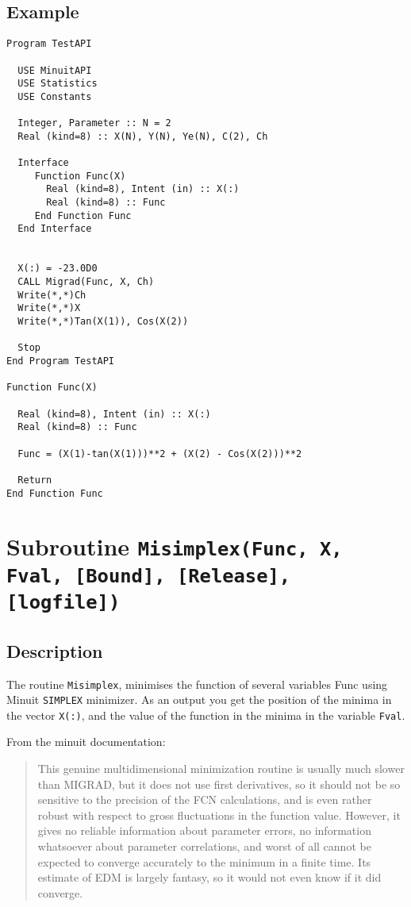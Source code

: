 \subsection{Example}

\begin{lstlisting}[emph=Minimize,
                   emphstyle=\color{blue},
                   frame=trBL,
                   caption=Using minuit library to minimize a function.,
                   label=minimize]
Program TestAPI

  USE MinuitAPI
  USE Statistics
  USE Constants

  Integer, Parameter :: N = 2
  Real (kind=8) :: X(N), Y(N), Ye(N), C(2), Ch

  Interface 
     Function Func(X)
       Real (kind=8), Intent (in) :: X(:)
       Real (kind=8) :: Func
     End Function Func
  End Interface
  

  X(:) = -23.0D0
  CALL Migrad(Func, X, Ch)
  Write(*,*)Ch
  Write(*,*)X
  Write(*,*)Tan(X(1)), Cos(X(2))

  Stop
End Program TestAPI

Function Func(X)

  Real (kind=8), Intent (in) :: X(:)
  Real (kind=8) :: Func

  Func = (X(1)-tan(X(1)))**2 + (X(2) - Cos(X(2)))**2

  Return
End Function Func
\end{lstlisting}

\section{Subroutine \texttt{Misimplex(Func, X, Fval, [Bound], [Release], [logfile]) }}

\subsection{Description}

The routine \texttt{Misimplex}, minimises the function of several
variables Func using Minuit \texttt{SIMPLEX} minimizer. As an output
you get the position of the minima in the 
vector \texttt{X(:)}, and the value of the function in the minima in
the variable \texttt{Fval}. 

From the minuit documentation:
\begin{quotation}
  This genuine multidimensional minimization routine is usually much
  slower than MIGRAD, but it does not use first derivatives, so it
  should not be so sensitive to the precision of the FCN calculations,
  and is even rather robust with respect to gross fluctuations in the
  function value. However, it gives no reliable information about
  parameter errors, no information whatsoever about parameter
  correlations, and worst of all cannot be expected to converge
  accurately to the minimum in a finite time. Its estimate of EDM is
  largely fantasy, so it would not even know if it did converge. 
\end{quotation}

